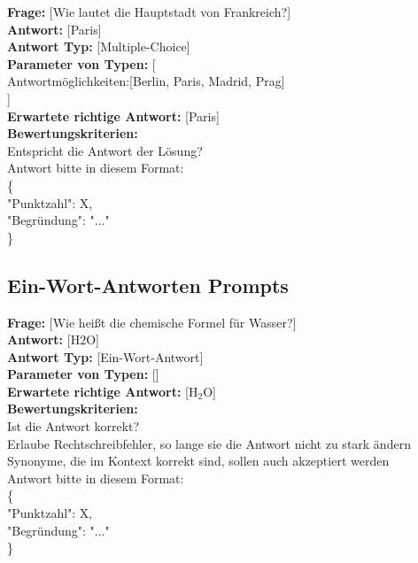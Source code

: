 \documentclass[a4paper,12pt]{article}
\begin{document}
\vspace{1em}

\textbf{Frage:} [Wie lautet die Hauptstadt von Frankreich?] \\
\textbf{Antwort:} [Paris] \\
\textbf{Antwort Typ:} [Multiple-Choice] \\
\textbf{Parameter von Typen:} [\\
Antwortmöglichkeiten:[Berlin, Paris, Madrid, Prag] \\
] \\
\textbf{Erwartete richtige Antwort:} [Paris] \\
\textbf{Bewertungskriterien:} \\
Entspricht die Antwort der Lösung? \\
Antwort bitte in diesem Format: \\
\{ \\
"Punktzahl": X, \\
"Begründung": "..." \\
\}

\subsection{Ein-Wort-Antworten Prompts}

\textbf{Frage:} [Wie heißt die chemische Formel für Wasser?] \\
\textbf{Antwort:} [H2O] \\
\textbf{Antwort Typ:} [Ein-Wort-Antwort] \\
\textbf{Parameter von Typen:} [] \\
\textbf{Erwartete richtige Antwort:} [H$_2$O] \\
\textbf{Bewertungskriterien:} \\
Ist die Antwort korrekt? \\
Erlaube Rechtschreibfehler, so lange sie die Antwort nicht zu stark ändern \\
Synonyme, die im Kontext korrekt sind, sollen auch akzeptiert werden \\
Antwort bitte in diesem Format: \\
\{ \\
"Punktzahl": X, \\
"Begründung": "..." \\
\}

\vspace{1em}
\end{document}
